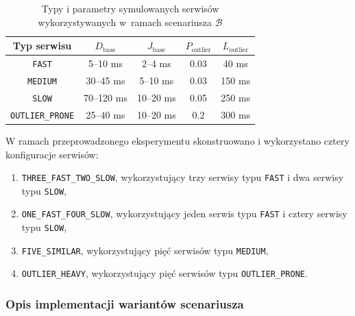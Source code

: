 \setlength{\tabcolsep}{0.5em}
\renewcommand{\arraystretch}{1.2}
\begin{table}[h!]
    \centering
    \begin{tabular}{|c|c|c|c|c|}
        \hline
        \textbf{Typ serwisu} & $D_{\text{base}}$ & $J_{\text{base}}$ & $P_{\text{outlier}}$ & $L_{\text{outlier}}$ \\
        \hline
        \texttt{FAST} & 5--10 ms & 2--4 ms & 0.03 & 40 ms \\
        \hline
        \texttt{MEDIUM} & 30--45 ms & 5--10 ms & 0.03 & 150 ms \\
        \hline
        \texttt{SLOW} & 70--120 ms & 10--20 ms & 0.05 & 250 ms \\
        \hline
        \texttt{OUTLIER\_PRONE} & 25--40 ms & 10--20 ms & 0.2 & 300 ms \\
        \hline
    \end{tabular}

    \caption{Typy i parametry symulowanych serwisów wykorzystywanych w~ramach scenariusza $\mathcal{B}$}
    \label{table:scenario-B-services-types}
\end{table}

W ramach przeprowadzonego eksperymentu skonstruowano i wykorzystano cztery konfiguracje serwisów:
\begin{enumerate}
    \itemsep0em
    \item \texttt{THREE\_FAST\_TWO\_SLOW}, wykorzystujący trzy serwisy typu \texttt{FAST} i dwa serwisy typu \texttt{SLOW},
    \item \texttt{ONE\_FAST\_FOUR\_SLOW}, wykorzystujący jeden serwis typu \texttt{FAST} i cztery serwisy typu \texttt{SLOW},
    \item \texttt{FIVE\_SIMILAR}, wykorzystujący pięć serwisów typu \texttt{MEDIUM},
    \item \texttt{OUTLIER\_HEAVY}, wykorzystujący pięć serwisów typu \texttt{OUTLIER\_PRONE}.
\end{enumerate}

\newpage
\subsubsection{Opis implementacji wariantów scenariusza}


